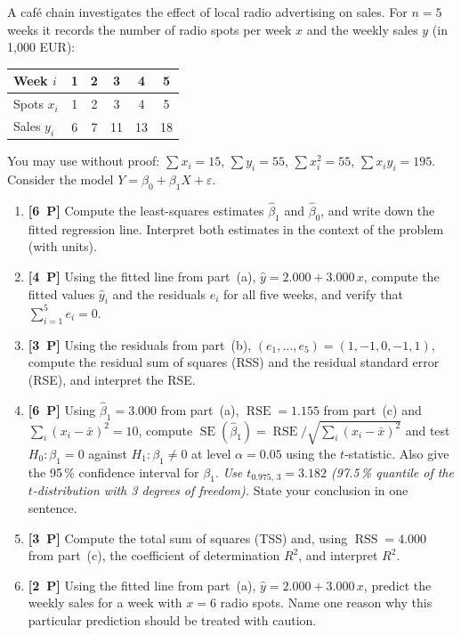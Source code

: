 \documentclass[11pt,a4paper]{article}
\newcommand{\pp}[1]{\textbf{[#1~P]}\enspace}
\begin{document}
A caf\'e chain investigates the effect of local radio advertising on sales.
For $n=5$ weeks it records the number of radio spots per week $x$ and the weekly sales $y$
(in 1{,}000 EUR):

\begin{center}
\begin{tabular}{lccccc}
\toprule
Week $i$ & 1 & 2 & 3 & 4 & 5\\
\midrule
Spots $x_i$ & 1 & 2 & 3 & 4 & 5\\
Sales $y_i$ & 6 & 7 & 11 & 13 & 18\\
\bottomrule
\end{tabular}
\end{center}

You may use without proof: $\sum x_i = 15$, $\sum y_i = 55$, $\sum x_i^2 = 55$,
$\sum x_i y_i = 195$. Consider the model $Y=\beta_0+\beta_1 X+\varepsilon$.

\begin{enumerate}[label=(\alph*),leftmargin=7mm,itemsep=2.5mm]
  \item \pp{6} Compute the least-squares estimates $\hat{\beta}_1$ and $\hat{\beta}_0$, and
    write down the fitted regression line. Interpret both estimates in the context of the
    problem (with units).
  \item \pp{4} Using the fitted line from part~(a), $\hat{y}=2.000+3.000\,x$, compute the
    fitted values $\hat{y}_i$ and the residuals $e_i$ for all five weeks, and verify that
    $\sum_{i=1}^{5} e_i = 0$.
  \item \pp{3} Using the residuals from part~(b), $(e_1,\dots,e_5)=(1,-1,0,-1,1)$, compute the
    residual sum of squares (RSS) and the residual standard error (RSE), and interpret the RSE.
  \item \pp{6} Using $\hat{\beta}_1=3.000$ from part~(a), $\operatorname{RSE}=1.155$ from
    part~(c) and $\sum_i (x_i-\bar{x})^2 = 10$, compute
    $\operatorname{SE}(\hat{\beta}_1)=\operatorname{RSE}/\sqrt{\sum_i (x_i-\bar{x})^2}$
    and test $H_0\!:\beta_1=0$ against $H_1\!:\beta_1\neq 0$ at level $\alpha=0.05$ using the
    $t$-statistic. Also give the 95\,\% confidence interval for $\beta_1$.
    \emph{Use $t_{0.975,\,3}=3.182$ (97.5\,\% quantile of the $t$-distribution with 3 degrees
    of freedom).} State your conclusion in one sentence.
  \item \pp{3} Compute the total sum of squares (TSS) and, using $\operatorname{RSS}=4.000$ from
    part~(c), the coefficient of determination $R^2$, and interpret $R^2$.
  \item \pp{2} Using the fitted line from part~(a), $\hat{y}=2.000+3.000\,x$, predict the weekly
    sales for a week with $x=6$ radio spots. Name one reason why this particular prediction
    should be treated with caution.
\end{enumerate}
\end{document}

